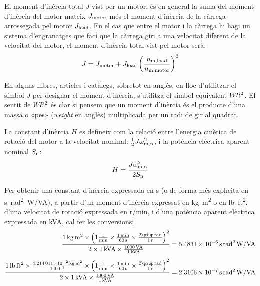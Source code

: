 El moment d'inèrcia total $J$ vist per un motor, és en general la suma del moment d'inèrcia del  motor mateix $J_\mathrm{motor}$ més el moment d'inèrcia de la càrrega arrossegada pel motor $J_\mathrm{load}$. En el cas que entre el motor i la càrrega hi hagi un sistema d'engranatges que faci que la càrrega giri a una velocitat diferent de la velocitat del motor, el  moment d'inèrcia total vist pel motor serà:
\begin{equation}\index{moment d'inèrcia}\index{J@$J$}
    J = J\ped{motor} +  J\ped{load}
    \left(\frac{n\ped{m,load}}{n\ped{m,motor}}\right)^2
\end{equation}

En alguns llibres, articles i catàlegs, sobretot en anglès, en lloc d'utilitzar el símbol $J$ per designar el moment d'inèrcia, s'utilitza el símbol equivalent $W\hspace{-0.2em}R^2$. El sentit de $W\hspace{-0.2em}R^2$ és clar si pensem que un moment d'inèrcia és el producte d'una massa o «pes» (\textit{weight} en anglès) multiplicada per un radi de gir al quadrat.

La constant d'inèrcia $H$ es defineix com la relació entre l'energia cinètica de rotació del motor  a la velocitat nominal: $\frac{1}{2} J \omega_\mathrm{m,n}^2$, i la  potència elèctrica aparent nominal $S_\mathrm{n}$:
\begin{equation}\index{constant d'inèrcia}\index{H@$H$}
    H = \frac{J \omega\ped{m,n}^2}{2 S\ped{n}}
\end{equation}

Per  obtenir una constant d'inèrcia  expressada en \unit{s} (o de forma més explícita en \unit{s.rad^2.W/VA}), a partir d'un moment d'inèrcia expressat en \unit{kg.m^2} o en \unit{lb.ft^2}, d'una velocitat de rotació expressada en \unit{r/min}, i d'una potència aparent elèctrica expressada en \unit{kVA}, cal  fer les conversions:
\begin{subequations}
\begin{align}
    \frac{\qty{1}{kg.m^2} \times \left(1\frac{\unit{r}}{\unit{min}} \times \frac{\qty{1}{min}}{\qty{60}{s}} \times \frac{2\piup\,\unit{rad}}{\qty{1}{r}}\right)^2}{2\times \qty{1}{kVA} \times \frac{\qty{1000}{VA}}{\qty{1}{kVA}}}  &= \qty{5,4831e-6}{s.rad^2.W/VA} \\[1ex]
   \frac{\qty{1}{lb.ft^2} \times \frac{\qty{4,214011e-2}{kg.m^2}}{\qty{1}{lb.ft^2}} \times \left(1\frac{\unit{r}}{\unit{min}} \times \frac{\qty{1}{min}}{\qty{60}{s}} \times \frac{2\piup\,\unit{rad}}{\qty{1}{r}}\right)^2}{2\times \qty{1}{kVA}  \times
   \frac{\qty{1000}{VA}}{\qty{1}{kVA}}} &= \qty{2,3106e-7}{s.rad^2.W/VA}
\end{align}
\end{subequations}

